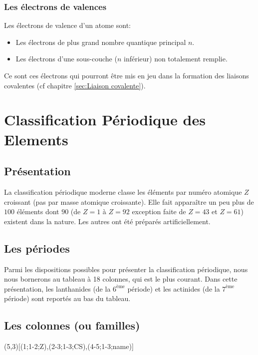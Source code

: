 \documentclass{article}
\begin{document}
\subsubsection{Les électrons de valences}

Les électrons de valence d'un atome sont: 
\begin{itemize}[label=$\ast$]
    \item Les électrons de plus grand nombre quantique principal $n$.
    \item Les électrons d'une sous-couche ($n$ inférieur) non totalement remplie.
\end{itemize} 

Ce sont ces électrons qui pourront être mis en jeu dans la formation des liaisons covalentes
(cf chapitre \ref{sec:Liaison covalente}).



\section{Classification Périodique des Elements}

\subsection{Présentation}

La classification périodique moderne classe les éléments par numéro atomique $Z$ croissant (pas par masse atomique croissante). Elle fait apparaître un peu plus de $100$ éléments dont $90$ (de $Z=1$ à $Z=92$ exception faite de $Z=43$ et $Z=61$) existent dans la nature. Les autres ont été préparés artificiellement. 

\subsection{Les périodes}

Parmi les dispositions possibles pour présenter la classification périodique, nous nous bornerons au tableau à 18 colonnes, qui est le plus courant. Dans cette présentation, les lanthanides (de la $6^{\text{ème}}$ période) et les actinides (de la $7^{\text{ème}}$ période) sont reportés au bas du tableau. 

\subsection{Les colonnes (ou familles)}

\pgfPTbuildcell(5,3)[(1;1-2;Z),(2-3;1-3;CS),(4-5;1-3;name)]
\hspace{0.5cm}\pgfPT[
    CS all=darkgray,    
    cell size=22pt, 
    show families, 
    families font color=black,
    show title=false, 
    show legend=false,
    families font=\tiny,
    name font=\Tiny
    ]
\end{document}

